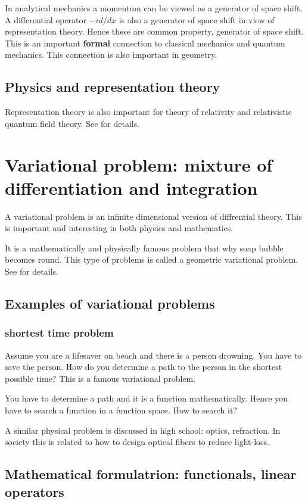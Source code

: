 \documentclass[openany, a4paper, oneside]{book}
\theoremstyle{break}
\theoremstyle{breakdefn}
\begin{document}
In analytical mechanics a momentum
can be viewed as a generator of space shift.
A differential operator $- i d/dx$ is also
a generator of space shift in view of representation theory.
Hence these are common property, generator of space shift.
This is an important \textbf{formal} connection to classical mechanics and quantum mechanics.
This connection is also important in geometry.
\subsection{Physics and representation theory}
\label{sec-4-1-4-4}

Representation theory is also important for
theory of relativity and relativistic quantum field theory.
See \cite{TakeshiHirai1, TakeshiHirai2} for details.
\section{Variational problem: mixture of differentiation and integration}
\label{sec-4-1-5}

A variational problem is an infinite dimensional version of diffrential theory.
This is important and interesting in both physics and mathematics.

It is a mathematically and physically famous problem that why soap bubble becomes round.
This type of problems is called a geometric variational problem.
See \cite{SeikiNishikawa1} for details.
\subsection{Examples of variational problems}
\label{sec-4-1-5-1}
\subsubsection{shortest time problem}
\label{sec-4-1-5-1-1}

Assume you are a lifesaver on beach and there is a person drowning.
You have to save the person.
How do you determine a path to the person in the shortest possible time?
This is a famous variational problem.

You have to determine a path and it is a function mathematically.
Hence you have to search a function in a function space.
How to search it?

A similar physical problem is discussed in high school: optics, refraction.
In society this is related to how to design optical fibers to reduce light-loss.
\subsection{Mathematical formulatrion: functionals, linear operators}
\label{sec-4-1-5-2}
\end{document}
